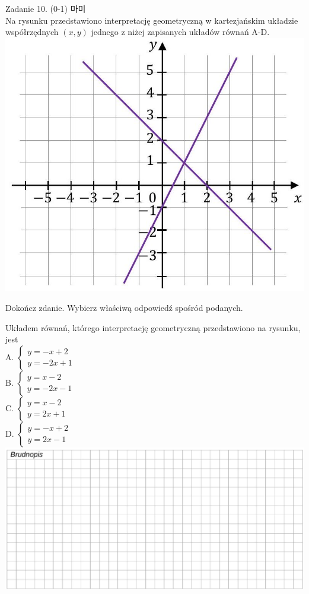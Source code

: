 \documentclass[10pt]{article}
\begin{document}
Zadanie 10. (0-1) 마미\\
Na rysunku przedstawiono interpretację geometryczną w kartezjańskim układzie współrzędnych \((x, y)\) jednego z niżej zapisanych układów równań A-D.\\
\includegraphics[max width=\textwidth, center]{2024_11_21_51cb67544fb9b029f01cg-10}

Dokończ zdanie. Wybierz właściwą odpowiedź spośród podanych.

Układem równań, którego interpretację geometryczną przedstawiono na rysunku, jest\\
A. \(\left\{\begin{array}{l}y=-x+2 \\ y=-2 x+1\end{array}\right.\)\\
B. \(\left\{\begin{array}{l}y=x-2 \\ y=-2 x-1\end{array}\right.\)\\
C. \(\left\{\begin{array}{l}y=x-2 \\ y=2 x+1\end{array}\right.\)\\
D. \(\left\{\begin{array}{l}y=-x+2 \\ y=2 x-1\end{array}\right.\)\\
\includegraphics[max width=\textwidth, center]{2024_11_21_51cb67544fb9b029f01cg-10(1)}
\end{document}
